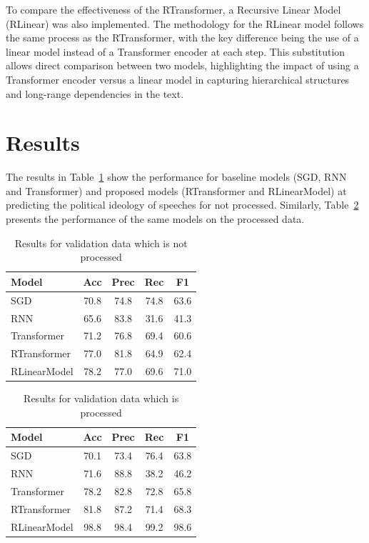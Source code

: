 \documentclass[10pt, a4paper]{article}
\begin{document}
To compare the effectiveness of the RTransformer, a Recursive Linear Model (RLinear) was also implemented. The methodology for the RLinear model follows the same process as the RTransformer, with the key difference being the use of a linear model instead of a Transformer encoder at each step. This substitution allows direct comparison between two models, highlighting the impact of using a Transformer encoder versus a linear model in capturing hierarchical structures and long-range dependencies in the text. 

\section{Results}
The results in Table~\ref{tab:not_processed_data} show the performance for baseline models (SGD, RNN and Transformer) and proposed models (RTransformer and RLinearModel) at predicting the political ideology of speeches for not processed. Similarly, Table~\ref{tab:processed_data} presents the performance of the same models on the processed data.

\begin{table}[H]
\caption{Results for validation data which is not processed}
\label{tab:not_processed_data}
\begin{center}
\begin{tabular}{lcccc}
\toprule
Model & Acc & Prec & Rec & F1 \\
\midrule
SGD          & 70.8 & 74.8 & 74.8 & 63.6 \\
RNN          & 65.6 & 83.8 & 31.6 & 41.3 \\
Transformer  & 71.2 & 76.8 & 69.4 & 60.6 \\
RTransformer & 77.0 & 81.8 & 64.9 & 62.4 \\
RLinearModel & 78.2 & 77.0 & 69.6 & 71.0 \\
\bottomrule
\end{tabular}
\end{center}
\end{table}

\begin{table}[H]
\caption{Results for validation data which is processed}
\label{tab:processed_data}
\begin{center}
\begin{tabular}{lcccc}
\toprule
Model & Acc & Prec & Rec & F1 \\
\midrule
SGD          & 70.1 & 73.4 & 76.4 & 63.8 \\
RNN          & 71.6 & 88.8 & 38.2 & 46.2 \\
Transformer  & 78.2 & 82.8 & 72.8 & 65.8 \\
RTransformer & 81.8 & 87.2 & 71.4 & 68.3 \\
RLinearModel & 98.8 & 98.4 & 99.2 & 98.6 \\
\bottomrule
\end{tabular}
\end{center}
\end{table}
\end{document}
